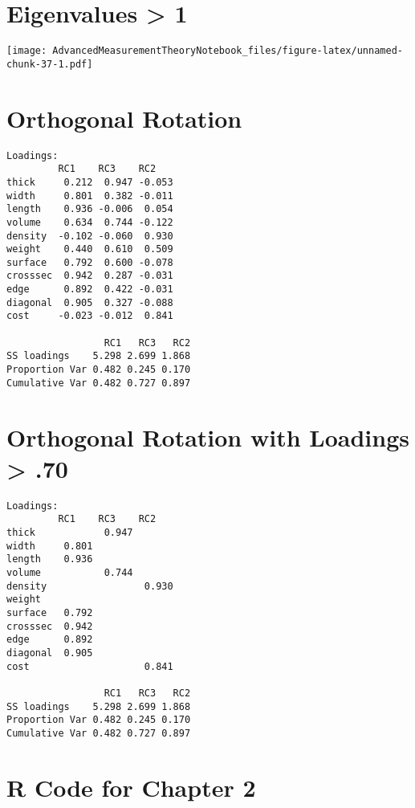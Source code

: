 \documentclass[
]{book}
\begin{document}
\hypertarget{eigenvalues-1}{%
\section{Eigenvalues \textgreater{} 1}\label{eigenvalues-1}}

\texttt{[image: AdvancedMeasurementTheoryNotebook\_files/figure-latex/unnamed-chunk-37-1.pdf]}

\hypertarget{orthogonal-rotation-1}{%
\section{Orthogonal Rotation}\label{orthogonal-rotation-1}}

\footnotesize

\begin{verbatim}
Loadings:
         RC1    RC3    RC2   
thick     0.212  0.947 -0.053
width     0.801  0.382 -0.011
length    0.936 -0.006  0.054
volume    0.634  0.744 -0.122
density  -0.102 -0.060  0.930
weight    0.440  0.610  0.509
surface   0.792  0.600 -0.078
crosssec  0.942  0.287 -0.031
edge      0.892  0.422 -0.031
diagonal  0.905  0.327 -0.088
cost     -0.023 -0.012  0.841

                 RC1   RC3   RC2
SS loadings    5.298 2.699 1.868
Proportion Var 0.482 0.245 0.170
Cumulative Var 0.482 0.727 0.897
\end{verbatim}

\hypertarget{orthogonal-rotation-with-loadings-.70}{%
\section{Orthogonal Rotation with Loadings \textgreater{} .70}\label{orthogonal-rotation-with-loadings-.70}}

\footnotesize

\begin{verbatim}
Loadings:
         RC1    RC3    RC2   
thick            0.947       
width     0.801              
length    0.936              
volume           0.744       
density                 0.930
weight                       
surface   0.792              
crosssec  0.942              
edge      0.892              
diagonal  0.905              
cost                    0.841

                 RC1   RC3   RC2
SS loadings    5.298 2.699 1.868
Proportion Var 0.482 0.245 0.170
Cumulative Var 0.482 0.727 0.897
\end{verbatim}

\hypertarget{r-code-for-chapter-2}{%
\section{R Code for Chapter 2}\label{r-code-for-chapter-2}}
\end{document}
